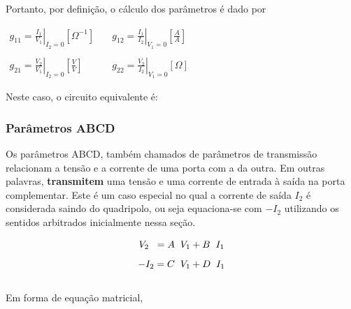\documentclass{article}
\numberwithin{equation}{section}
\let\dfr\dfrac
\begin{document}
Portanto, por definição, o cálculo dos parâmetros é dado por
\begin{center}
    $\begin{matrix} %
            g_{11}=\displaystyle\left.\frac{I_{1}}{V_{1}}\right|_{I_{2}=0} [\Omega^{-1}] &\quad g_{12}=\displaystyle\left.\frac{I_{1}}{I_{2}}\right|_{V_{1}=0}\left[\frac{A}{A}\right]\\\\
            g_{21}=\displaystyle\left.\frac{V_{2}}{V_{1}}\right|_{I_{2}=0}\left[\frac{V}{V}\right]&\quad
            g_{22}=\displaystyle\left.\frac{V_{2}}{I_{2}}\right|_{V_{1}=0} [\Omega]
    \end{matrix}$
\end{center}

Neste caso, o circuito equivalente é:

\begin{center}
\end{center}

\subsubsection{Parâmetros ABCD}
\label{subsubsec:quadripolostransm}
Os parâmetros ABCD, também chamados de parâmetros de transmissão relacionam a tensão e a corrente de uma porta com a da outra. Em outras palavras, \textbf{transmitem} uma tensão e uma corrente de entrada à saída na porta complementar. Este é um caso especial no qual a corrente de saída $I_{2}$ é considerada saindo do quadripolo, ou seja equaciona-se com $-I_{2}$ utilizando os sentidos arbitrados inicialmente nessa seção.

\begin{equation*}
    V_{2} \hspace{0.2cm} =A \hspace{0.2cm} V_{1}+ B \hspace{0.2cm} I_{1}
\end{equation*}
\begin{equation*}
    -I_{2}=C \hspace{0.2cm} V_{1}+D \hspace{0.2cm} I_{1}
\end{equation*}\\
Em forma de equação matricial,
\end{document}
